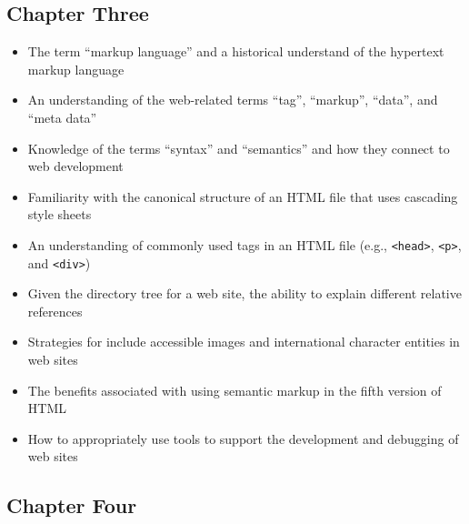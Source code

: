 \documentclass[11pt]{article}
\newcommand{\program}[1]{\lstinline{#1}}
\begin{document}
\vspace*{-.2in}
\subsection*{Chapter Three}

\begin{itemize}

  \itemsep 0in

  \item The term ``markup language'' and a historical understand of the
    hypertext markup language
  \item An understanding of the web-related terms ``tag'', ``markup'', ``data'',
    and ``meta data''
  \item Knowledge of the terms ``syntax'' and ``semantics'' and how they
    connect to web development
  \item Familiarity with the canonical structure of an HTML file that
    uses cascading style sheets
  \item An understanding of commonly used tags in an HTML file (e.g., \program{<head>},
    \program{<p>}, and \program{<div>})
  \item Given the directory tree for a web site, the ability to explain
    different relative references
  \item Strategies for include accessible images and international character
    entities in web sites
  \item The benefits associated with using semantic markup in the fifth version
    of HTML
  \item How to appropriately use tools to support the development and
    debugging of web sites

\end{itemize}

\vspace*{-.2in}
\subsection*{Chapter Four}
\end{document}

